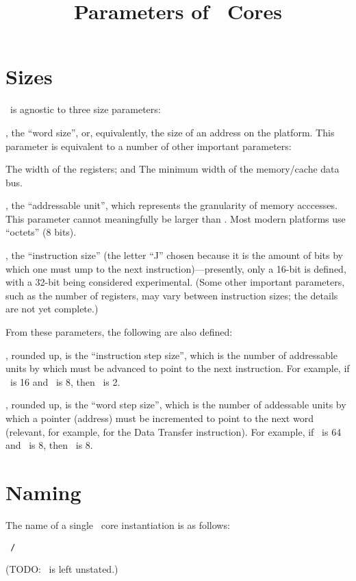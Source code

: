 

\title{Parameters of \ass\ Cores}

\chapter{Sizes}

\ass\ is agnostic to three size parameters:

\medskip

\li \wsi, the ``word size'', or, equivalently, the size of an address on the
platform. This parameter is equivalent to a number of other important
parameters:

\smallskip

\lili The width of the registers; and
\lili The minimum width of the memory/cache data bus.

\smallskip

\li \asi, the ``addressable unit'', which represents the granularity of memory
acccesses. This parameter cannot meaningfully be larger than \wsi. Most modern
platforms use ``octets'' (8 bits).

\li \isi, the ``instruction size'' (the letter ``J'' chosen because it is the
amount of bits by which one must ump to the next
instruction)---presently, only a 16-bit \isi is defined, with a 32-bit being
considered experimental. (Some other important parameters, such as the number
of registers, may vary between instruction sizes; the details are not yet
complete.)

\medskip

From these parameters, the following are also defined:

\medskip

\li {\tt \ist\ = \isi\ / \asi}, rounded up, is the ``instruction step size'',
which is the number of addressable units by which  must be advanced to
point to the next instruction. For example, if \isi\ is 16 and \asi\ is 8, then
\ist\ is 2.

\li {\tt \wst\ = \wsi\ / \asi}, rounded up, is the ``word step size'', which is
the number of addessable units by which a pointer (address) must be incremented
to point to the next word (relevant, for example, for the Data Transfer
 instruction). For example, if \wsi\ is 64 and \asi\ is 8, then \wst\
is 8.

\chapter{Naming}

The name of a single \ass\ core instantiation is as follows:

{\noindent\qquad\tt\ass\ \isi/\wsi}

(TODO: \asi\ is left unstated.)

\maybye
